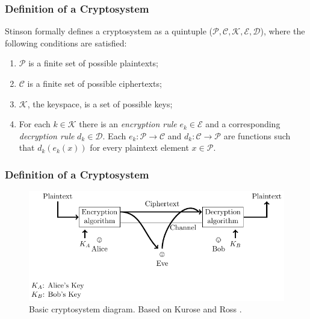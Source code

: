\documentclass{beamer}
\begin{document}
\begin{frame}
\frametitle{Definition of a Cryptosystem}

Stinson \cite{stinson2005cryptography} formally defines a cryptosystem as a quintuple ($\mathcal{P}, \mathcal{C}, \mathcal{K}, \mathcal{E}, \mathcal{D}$), where the following conditions are satisfied: 
\begin{enumerate}
\item $\mathcal{P}$ is a finite set of possible plaintexts;
\item $\mathcal{C}$ is a finite set of possible ciphertexts;
\item $\mathcal{K}$, the keyspace, is a set of possible keys;
\item For each $k \in \mathcal{K}$ there is an \textit{encryption rule} $ e_{k} \in \mathcal{E}$  and a corresponding \textit{decryption rule} $ d_{k} \in \mathcal{D}$. Each $e_{k}: \mathcal{P} \rightarrow \mathcal{C}$ and $d_{k}: \mathcal{C} \rightarrow \mathcal{P}$ are functions such that $d_{k}(e_{k}(x))$ for every plaintext element $x \in \mathcal{P}$.
\end{enumerate}

\end{frame}

\begin{frame}
\frametitle{Definition of a Cryptosystem}

\begin{figure}[H]
  \centering
  \includegraphics{../img/basiccryptosystem}
  \caption[Basic cryptosystem diagram]{Basic cryptosystem diagram. Based on Kurose and Ross \cite{kurose2010computer}.}
  \label{fig:cryptoflow}
\end{figure}


\end{frame}

\end{document}
